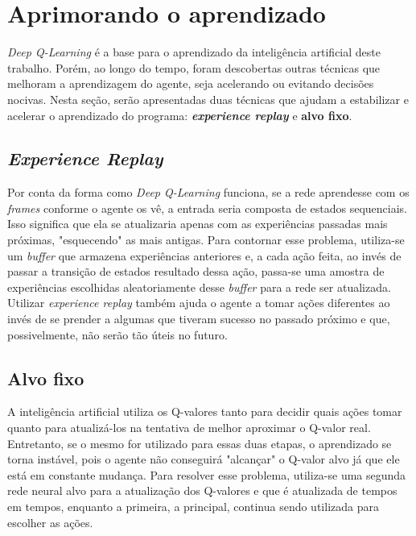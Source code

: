 
\section{Aprimorando o aprendizado}
\label{sec:enhance}

\textit{Deep Q-Learning} é a base para o aprendizado da inteligência artificial deste trabalho.
Porém, ao longo do tempo, foram descobertas outras técnicas que melhoram a aprendizagem do agente, seja acelerando ou evitando decisões nocivas.
Nesta seção, serão apresentadas duas técnicas que ajudam a estabilizar e acelerar o aprendizado do programa:
\textit{\textbf{experience replay}} e \textbf{alvo fixo}.


\subsection{\textit{Experience Replay}}
\label{sec:er}

Por conta da forma como \textit{Deep Q-Learning} funciona, se a rede aprendesse com os \textit{frames} conforme o agente os vê, a entrada seria composta de estados sequenciais.
Isso significa que ela se atualizaria apenas com as experiências passadas mais próximas, "esquecendo"{} as mais antigas.
Para contornar esse problema, utiliza-se um \textit{buffer} que armazena experiências anteriores e, a cada ação feita, ao invés de passar a transição de estados resultado dessa ação, passa-se uma amostra de experiências escolhidas aleatoriamente desse \textit{buffer} para a rede ser atualizada.
Utilizar \textit{experience replay} também ajuda o agente a tomar ações diferentes ao invés de se prender a algumas que tiveram sucesso no passado próximo e que, possivelmente, não serão tão úteis no futuro.


\subsection{Alvo fixo}
\label{sec:ft}

A inteligência artificial utiliza os Q-valores tanto para decidir quais ações tomar quanto para atualizá-los na tentativa de melhor aproximar o Q-valor real.
Entretanto, se o mesmo for utilizado para essas duas etapas, o aprendizado se torna instável, pois o agente não conseguirá "alcançar"{} o Q-valor alvo já que ele está em constante mudança.
Para resolver esse problema, utiliza-se uma segunda rede neural alvo para a atualização dos Q-valores e que é atualizada de tempos em tempos, enquanto a primeira, a principal, continua sendo utilizada para escolher as ações.

